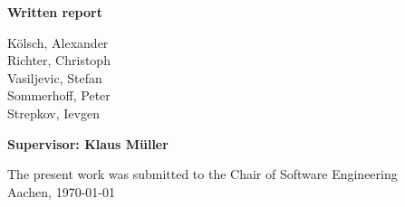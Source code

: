 \begin{titlepage}
\begin{flushleft}
{  {\Large \textbf{Written report}\\}
  \vspace{3em} 
   
   
   \vspace{3em}
   
   {\LARGE {Kölsch, Alexander}\\}
   \vspace{1em} 
   {\LARGE {Richter, Christoph}\\}
   \vspace{1em} 
   {\LARGE {Vasiljevic, Stefan}\\}
   \vspace{1em} 
   {\LARGE {Sommerhoff, Peter}\\}
   \vspace{1em} 
   {\LARGE {Strepkov, Ievgen}\\}
   \vspace{5em} 
   
   {\Large \textbf{Supervisor: Klaus Müller}\\}
   \vspace{7em} 

    {\large The present work was submitted to the Chair of Software Engineering \\}
    \vspace{1em}
		{\large	Aachen, \today\\}
  }
  
  
  
\end{flushleft}

\end{titlepage}





